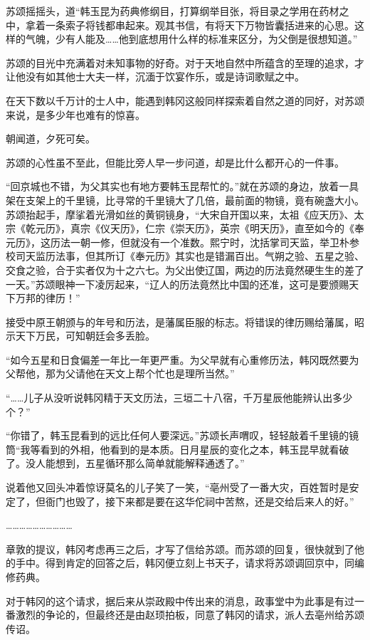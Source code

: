苏颂摇摇头，道“韩玉昆为药典修纲目，打算纲举目张，将目录之学用在药材之中，拿着一条索子将钱都串起来。观其书信，有将天下万物皆囊括进来的心思。这样的气魄，少有人能及……他到底想用什么样的标准来区分，为父倒是很想知道。”

苏颂的目光中充满着对未知事物的好奇。对于天地自然中所蕴含的至理的追求，才让他没有如其他士大夫一样，沉湎于饮宴作乐，或是诗词歌赋之中。

在天下数以千万计的士人中，能遇到韩冈这般同样探索着自然之道的同好，对苏颂来说，是多少年也难有的惊喜。

朝闻道，夕死可矣。

苏颂的心性虽不至此，但能比旁人早一步问道，却是比什么都开心的一件事。

“回京城也不错，为父其实也有地方要韩玉昆帮忙的。”就在苏颂的身边，放着一具架在支架上的千里镜，比寻常的千里镜大了几倍，最前面的物镜，竟有碗盏大小。苏颂抬起手，摩挲着光滑如丝的黄铜镜身，“大宋自开国以来，太祖《应天历》、太宗《乾元历》，真宗《仪天历》，仁宗《崇天历》，英宗《明天历》，直至如今的《奉元历》，这历法一朝一修，但就没有一个准数。熙宁时，沈括掌司天监，举卫朴参校司天监历法事，但其所订《奉元历》其实也是错漏百出。气朔之验、五星之验、交食之验，合于实者仅为十之六七。为父出使辽国，两边的历法竟然硬生生的差了一天。”苏颂眼神一下凌厉起来，“辽人的历法竟然比中国的还准，这可是要颁赐天下万邦的律历！”

接受中原王朝颁与的年号和历法，是藩属臣服的标志。将错误的律历赐给藩属，昭示天下万民，可知朝廷会多丢脸。

“如今五星和日食偏差一年比一年更严重。为父早就有心重修历法，韩冈既然要为父帮他，那为父请他在天文上帮个忙也是理所当然。”

“……儿子从没听说韩冈精于天文历法，三垣二十八宿，千万星辰他能辨认出多少个？”

“你错了，韩玉昆看到的远比任何人要深远。”苏颂长声喟叹，轻轻敲着千里镜的镜筒“我等看到的外相，他看到的是本质。日月星辰的变化之本，韩玉昆早就看破了。没人能想到，五星循环那么简单就能解释通透了。”

说着他又回头冲着惊讶莫名的儿子笑了一笑，“亳州受了一番大灾，百姓暂时是安定了，但衙门也毁了，接下来都是要在这华佗祠中苦熬，还是交给后来人的好。”

…………………………

章敦的提议，韩冈考虑再三之后，才写了信给苏颂。而苏颂的回复，很快就到了他的手中。得到肯定的回答之后，韩冈便立刻上书天子，请求将苏颂调回京中，同编修药典。

对于韩冈的这个请求，据后来从崇政殿中传出来的消息，政事堂中为此事是有过一番激烈的争论的，但最终还是由赵顼拍板，同意了韩冈的请求，派人去亳州给苏颂传诏。

